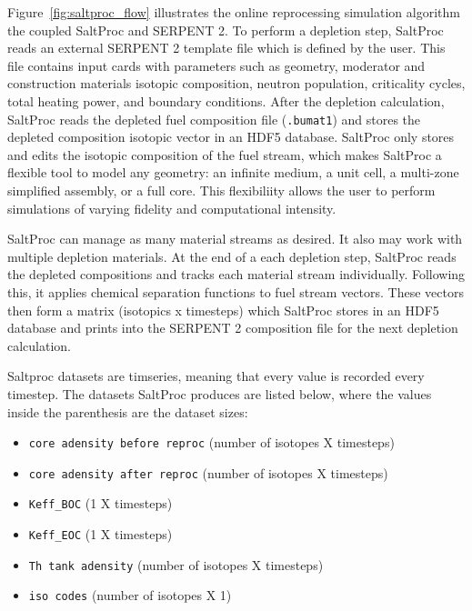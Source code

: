 Figure~\ref{fig:saltproc_flow} illustrates the  online reprocessing simulation algorithm the coupled SaltProc and SERPENT 2. To perform a depletion step,
SaltProc reads an external SERPENT 2 template file which is defined by the user. This file contains input cards with parameters such as geometry,
moderator and construction materials isotopic composition, neutron population, criticality cycles, total heating power, and boundary conditions.
After the depletion calculation, SaltProc reads the depleted fuel composition file (\texttt{.bumat1}) and stores the depleted
composition isotopic vector in an HDF5 database. SaltProc only stores and edits the isotopic composition of the fuel stream,
which makes SaltProc a flexible tool to model any geometry: an infinite medium, a unit cell, a multi-zone simplified assembly, or a full core.
This flexibiliity allows the user to perform simulations of varying fidelity and computational intensity.

SaltProc can manage as many material streams as desired. It also may work with multiple depletion materials. At the end of a each depletion
step, SaltProc reads the depleted compositions and tracks each material stream individually. Following this, it applies chemical
separation functions to fuel stream vectors. These vectors then form a matrix (isotopics x timesteps) which SaltProc stores in an HDF5 database
and prints into the SERPENT 2 composition file for the next depletion calculation.

Saltproc datasets are timseries, meaning that every value is recorded every timestep. The datasets SaltProc produces are listed below,
where the values inside the parenthesis are the dataset sizes:

\begin{itemize}
    \item \texttt{core adensity before reproc} (number of isotopes X timesteps)
    \item \texttt{core adensity after reproc} (number of isotopes X timesteps)
    \item \texttt{Keff_BOC} (1 X timesteps)
    \item \texttt{Keff_EOC} (1 X timesteps)
    \item \texttt{Th tank adensity} (number of isotopes X timesteps)
    \item \texttt{iso codes} (number of isotopes X 1)
\end{itemize}

